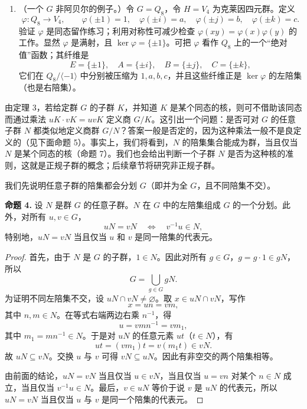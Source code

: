 \begin{enumerate}[label=(\arabic*)]
  群运算（此处为加法）既可通过 $\varphi$ 描述：直线 $x=a$ 与直线 $x=b$ 的和是直线 $x=a+b$；也可用陪集代表元直接描述：含 $(a,y_1)$ 的竖直线与含 $(b,y_2)$ 的竖直线之和，是含 $(a+b,y_1+y_2)$ 的竖直线。注意代表元的选择不重要（即 $y$ 坐标不重要）。
  \item （一个 $G$ 非阿贝尔的例子。）令 $G=Q_8$，令 $H=V_4$ 为克莱因四元群。定义
  \[
    \varphi:Q_8\to V_4,
    \qquad \varphi(\pm1)=1,
    \quad \varphi(\pm i)=a,
    \quad \varphi(\pm j)=b,
    \quad \varphi(\pm k)=c.
  \]
  验证 $\varphi$ 是同态留作练习；利用对称性可减少检查 $\varphi(xy)=\varphi(x)\varphi(y)$ 的工作。显然 $\varphi$ 是满射，且 $\ker\varphi=\{\pm1\}$。可把 $\varphi$ 看作 $Q_8$ 上的一个“绝对值”函数；其纤维是
  \[
    E=\{\pm1\},\quad A=\{\pm i\},\quad B=\{\pm j\},\quad C=\{\pm k\},
  \]
  它们在 $Q_8/\langle -1\rangle$ 中分别被压缩为 $1,a,b,c$，并且这些纤维正是 $\ker\varphi$ 的左陪集（也是右陪集）。
\end{enumerate}

由定理 3，若给定群 $G$ 的子群 $K$，并知道 $K$ 是某个同态的核，则可不借助该同态而通过乘法 $uK\cdot vK=uvK$ 定义商 $G/K$。这引出一个问题：是否可对 $G$ 的任意子群 $N$ 都类似地定义商群 $G/N$？答案一般是否定的，因为这种乘法一般不是良定义的（见下面命题 5）。事实上，我们将看到，$N$ 的陪集集合能成为群，当且仅当 $N$ 是某个同态的核（命题 7）。我们也会给出判断一个子群 $N$ 是否为这种核的准则，这就是正规子群的概念；后续章节将研究非正规子群。

我们先说明任意子群的陪集都会分划 $G$（即并为全 $G$，且不同陪集不交）。

\medskip
\noindent\textbf{命题 4.} 设 $N$ 是群 $G$ 的任意子群。$N$ 在 $G$ 中的左陪集组成 $G$ 的一个分划。此外，对所有 $u,v\in G$，
\[
  uN=vN\quad\Longleftrightarrow\quad v^{-1}u\in N,
\]
特别地，$uN=vN$ 当且仅当 $u$ 和 $v$ 是同一陪集的代表元。

\begin{proof}
首先，由于 $N$ 是 $G$ 的子群，$1\in N$。因此对所有 $g\in G$，$g=g\cdot1\in gN$，所以
\[
  G=\bigcup_{g\in G} gN.
\]
为证明不同左陪集不交，设 $uN\cap vN\neq\varnothing$。取 $x\in uN\cap vN$，写作
\[
  x=un=vm,
\]
其中 $n,m\in N$。在等式右端两边右乘 $n^{-1}$，得
\[
  u=vmn^{-1}=vm_1,
\]
其中 $m_1=mn^{-1}\in N$。于是对 $uN$ 的任意元素 $ut$（$t\in N$），有
\[
  ut=(vm_1)t=v(m_1t)\in vN.
\]
故 $uN\subseteq vN$。交换 $u$ 与 $v$ 可得 $vN\subseteq uN$。因此有非空交的两个陪集相等。

由前面的结论，$uN=vN$ 当且仅当 $u\in vN$，当且仅当 $u=vn$ 对某个 $n\in N$ 成立，当且仅当 $v^{-1}u\in N$。最后，$v\in uN$ 等价于说 $v$ 是 $uN$ 的代表元，所以 $uN=vN$ 当且仅当 $u$ 与 $v$ 是同一个陪集的代表元。
\end{proof}

